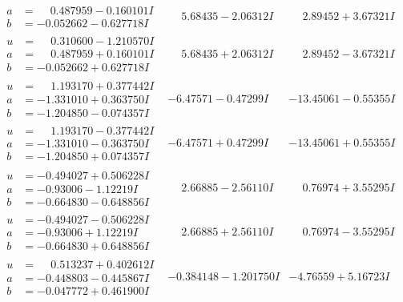 \documentclass[1p]{elsarticle_modified}
\theoremstyle{definition}
\begin{document}
$$\begin{array}{c|c|c}
\begin{aligned}
a &= \phantom{-}0.487959 - 0.160101 I \\
b &= -0.052662 - 0.627718 I\end{aligned}
 & \phantom{-}5.68435 - 2.06312 I & \phantom{-}2.89452 + 3.67321 I \\ \hline\begin{aligned}
u &= \phantom{-}0.310600 - 1.210570 I \\
a &= \phantom{-}0.487959 + 0.160101 I \\
b &= -0.052662 + 0.627718 I\end{aligned}
 & \phantom{-}5.68435 + 2.06312 I & \phantom{-}2.89452 - 3.67321 I \\ \hline\begin{aligned}
u &= \phantom{-}1.193170 + 0.377442 I \\
a &= -1.331010 + 0.363750 I \\
b &= -1.204850 - 0.074357 I\end{aligned}
 & -6.47571 - 0.47299 I & -13.45061 - 0.55355 I \\ \hline\begin{aligned}
u &= \phantom{-}1.193170 - 0.377442 I \\
a &= -1.331010 - 0.363750 I \\
b &= -1.204850 + 0.074357 I\end{aligned}
 & -6.47571 + 0.47299 I & -13.45061 + 0.55355 I \\ \hline\begin{aligned}
u &= -0.494027 + 0.506228 I \\
a &= -0.93006 - 1.12219 I \\
b &= -0.664830 - 0.648856 I\end{aligned}
 & \phantom{-}2.66885 - 2.56110 I & \phantom{-}0.76974 + 3.55295 I \\ \hline\begin{aligned}
u &= -0.494027 - 0.506228 I \\
a &= -0.93006 + 1.12219 I \\
b &= -0.664830 + 0.648856 I\end{aligned}
 & \phantom{-}2.66885 + 2.56110 I & \phantom{-}0.76974 - 3.55295 I \\ \hline\begin{aligned}
u &= \phantom{-}0.513237 + 0.402612 I \\
a &= -0.448803 - 0.445867 I \\
b &= -0.047772 + 0.461900 I\end{aligned}
 & -0.384148 - 1.201750 I & -4.76559 + 5.16723 I \\ \hline\begin{aligned}

\end{aligned}
\end{array}$$
\end{document}
